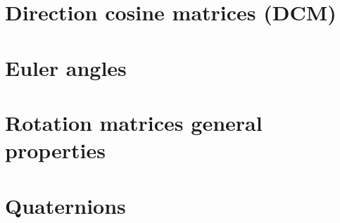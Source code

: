 \section{Direction cosine matrices (DCM)}

\section{Euler angles}

\section{Rotation matrices general properties}

\section{Quaternions}